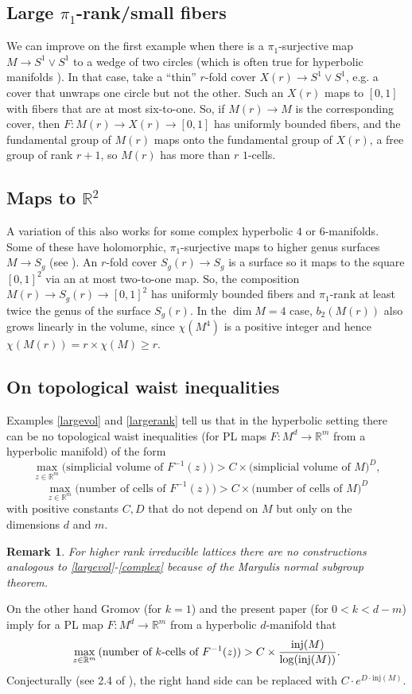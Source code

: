 \documentclass[11pt,letterpaper]{amsart}
\newtheorem*{remark}{Remark}
\begin{document}
\subsection{Large $\pi_1$-rank/small fibers\label{largerank}} We can improve on the first example when there is a $\pi_1$-surjective map $M\rightarrow S^1 \vee S^1$ to a wedge of two circles (which is often true for hyperbolic manifolds \cite{lubotzky}). In that case, take a ``thin'' $r$-fold cover $X(r)\rightarrow S^1 \vee S^1$, e.g. a cover that unwraps one circle but not the other. Such an $X(r)$ maps to $[0,1]$ with fibers that are at most six-to-one. So, if $M(r)\rightarrow M$ is the corresponding cover, then $F:M(r)\rightarrow X(r)\rightarrow [0,1]$ has uniformly bounded fibers, and the fundamental group of $M(r)$ maps onto the fundamental group of $X(r)$, a free group of rank $r+1$, so $M(r)$ has more than $r$ $1$-cells.

\subsection{Maps to $\mathbb R^2$\label{complex}} A variation of this also works for some complex hyperbolic $4$ or $6$-manifolds. Some of these have holomorphic, $\pi_1$-surjective maps to higher genus surfaces $M\rightarrow S_g$ (see \cite{deraux}). An $r$-fold cover $S_g(r)\rightarrow S_g$ is a surface so it maps to the square $[0,1]^2$ via an at most two-to-one map. So, the composition $M(r)\rightarrow S_g(r)\rightarrow [0,1]^2$ has uniformly bounded fibers and $\pi_1$-rank at least twice the genus of the surface $S_g(r)$. In the $\dim M=4$ case, $b_2(M(r))$ also grows linearly in the volume, since $\chi(M^4)$ is a positive integer and hence $\chi(M(r))=r\times \chi(M)\geq r$.

\subsection{On topological waist inequalities} Examples \ref{largevol} and \ref{largerank} tell us that in the hyperbolic setting there can be no topological waist inequalities (for PL maps $F:M^d\rightarrow \mathbb R^m$ from a hyperbolic manifold) of the form
$$
\max_{z\in\mathbb R^m} \mbox{(simplicial volume of } F^{-1}(z)) > C \times\mbox{(simplicial volume of } M)^D,
$$
$$
\max_{z\in\mathbb R^m} \mbox{(number of cells of } F^{-1}(z)) > C\times\mbox{(number of cells of } M)^D
$$
with positive constants $C,D$ that do not depend on $M$ but only on the dimensions $d$ and $m$.
\begin{remark}
For higher rank irreducible lattices there are no constructions analogous to \ref{largevol}-\ref{complex} because of the Margulis normal subgroup theorem. 
\end{remark}
On the other hand Gromov \cite{gromovexpanders} (for $k=1$) and the present paper (for $0<k<d-m$) imply for a PL map $F:M^d\rightarrow \mathbb R^m$ from a hyperbolic $d$-manifold that
$$
\max_{z\in\mathbb R^m} \mbox{(number of }k\mbox{-cells of } F^{-1}(z)) > C \times {\mathrm{inj}(M)\over\log(\mathrm{inj}(M))}.
$$
Conjecturally (see 2.4 of \cite{gromovexpanders}), the right hand side can be replaced with $C\cdot e^{D\cdot \mathrm{inj}(M)}$. 
\end{document}
